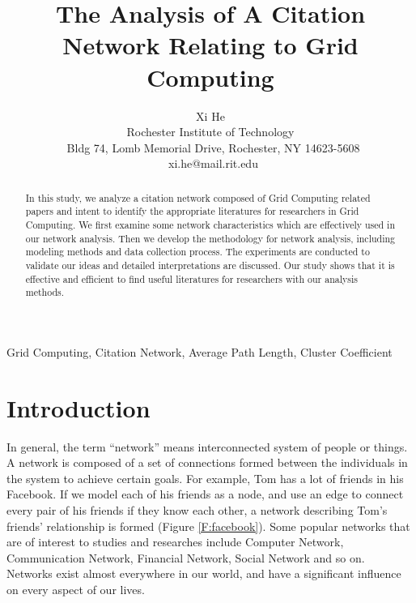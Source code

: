 
\newcommand{\GVL}[1]{{\color{red}\em  GVL: #1}}
\newcommand{\E}[1]{{\color{red}~\blacksquare~\footnote{grammar, spelling, sentence, or other error}~}}

\newcommand{\SHELL}{GridShell}
\newcommand{\AUTHOR}{%
Xi He\\
Rochester Institute of Technology\\
~Bldg 74, Lomb Memorial Drive, Rochester, NY 14623-5608 \\
~xi.he@mail.rit.edu%
}
\newcommand{\TITLE}{The Analysis of A Citation Network Relating to Grid Computing }


\title{\TITLE}
\author{\AUTHOR}

\maketitle

\begin{abstract}
In this study, we analyze a citation network composed of Grid Computing related papers and intent to identify the appropriate literatures for researchers in Grid Computing. We first examine some network characteristics which are effectively used in our network analysis. Then we develop the methodology for network analysis, including modeling methods and data collection process. The experiments are conducted to validate our ideas and detailed interpretations are discussed. Our study shows that it is effective and efficient to find useful literatures for researchers with our analysis methods.
\end{abstract}
\begin{keywords}
Grid Computing, Citation Network, Average Path Length, Cluster Coefficient
\end{keywords}
\section{Introduction}

In general, the term ``network'' means interconnected system of people or things. A network is composed of a set of connections formed between the individuals in the system to achieve certain goals. For example, Tom has a lot of friends in his Facebook. If we model each of his friends as a node, and use an edge to connect every pair of his friends if they know each other,  a network describing Tom's friends' relationship is formed (Figure \ref{F:facebook}). Some popular networks that are of interest to studies and researches include Computer Network, Communication Network, Financial Network, Social Network and so on.  Networks exist almost everywhere in our world, and have a significant influence on every aspect of our lives.  

